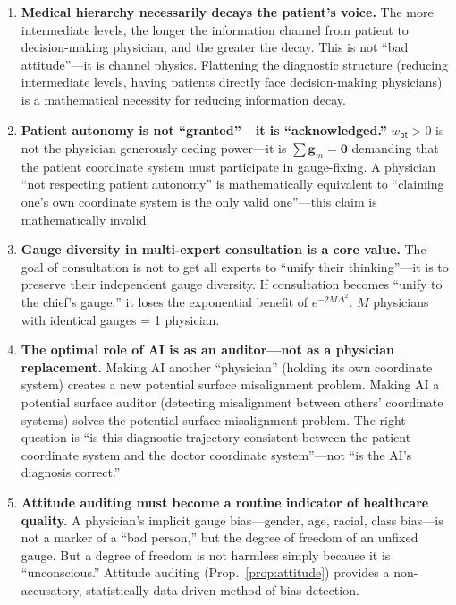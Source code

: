\documentclass[12pt,a4paper]{article}
\theoremstyle{remark}
\newcommand{\pt}{\textsf{pt}}
\begin{document}
\begin{enumerate}[label=\textbf{(\arabic*)}]
    \item \textbf{Medical hierarchy necessarily decays the patient's voice.} The more intermediate levels, the longer the information channel from patient to decision-making physician, and the greater the decay. This is not ``bad attitude''---it is channel physics. Flattening the diagnostic structure (reducing intermediate levels, having patients directly face decision-making physicians) is a mathematical necessity for reducing information decay.

    \item \textbf{Patient autonomy is not ``granted''---it is ``acknowledged.''} $w_{\pt} > 0$ is not the physician generously ceding power---it is $\sum \mathbf{g}_m = \mathbf{0}$ demanding that the patient coordinate system must participate in gauge-fixing. A physician ``not respecting patient autonomy'' is mathematically equivalent to ``claiming one's own coordinate system is the only valid one''---this claim is mathematically invalid.

    \item \textbf{Gauge diversity in multi-expert consultation is a core value.} The goal of consultation is not to get all experts to ``unify their thinking''---it is to preserve their independent gauge diversity. If consultation becomes ``unify to the chief's gauge,'' it loses the exponential benefit of $e^{-2M\Delta^2}$. $M$ physicians with identical gauges = 1 physician.

    \item \textbf{The optimal role of AI is as an auditor---not as a physician replacement.} Making AI another ``physician'' (holding its own coordinate system) creates a new potential surface misalignment problem. Making AI a potential surface auditor (detecting misalignment between others' coordinate systems) solves the potential surface misalignment problem. The right question is ``is this diagnostic trajectory consistent between the patient coordinate system and the doctor coordinate system''---not ``is the AI's diagnosis correct.''

    \item \textbf{Attitude auditing must become a routine indicator of healthcare quality.} A physician's implicit gauge bias---gender, age, racial, class bias---is not a marker of a ``bad person,'' but the degree of freedom of an unfixed gauge. But a degree of freedom is not harmless simply because it is ``unconscious.'' Attitude auditing (Prop.~\ref{prop:attitude}) provides a non-accusatory, statistically data-driven method of bias detection.


\end{enumerate}
\end{document}
